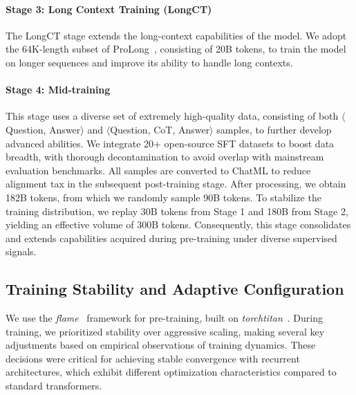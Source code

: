 \documentclass[]{bytedance_seed}
\newcommand{\1}{\mathbf{1}}
\begin{document}
\paragraph{Stage 3: Long Context Training (LongCT)}
The LongCT stage extends the long-context capabilities of the model. We adopt the 64K-length subset of ProLong~\cite{gao2024train}, consisting of 20B tokens, to train the model on longer sequences and improve its ability to handle long contexts.

\paragraph{Stage 4: Mid-training}
This stage uses a diverse set of extremely high-quality data, consisting of both $\langle$Question, Answer$\rangle$ and $\langle$Question, CoT, Answer$\rangle$ samples, to further develop advanced abilities. We integrate 20+ open-source SFT datasets to boost data breadth, with thorough decontamination to avoid overlap with mainstream evaluation benchmarks. All samples are converted to ChatML to reduce alignment tax in the subsequent post-training stage. After processing, we obtain 182B tokens, from which we randomly sample 90B tokens. To stabilize the training distribution, we replay 30B tokens from Stage 1 and 180B from Stage 2, yielding an effective volume of 300B tokens. Consequently, this stage consolidates and extends capabilities acquired during pre-training under diverse supervised signals.




\subsection{Training Stability and Adaptive Configuration}

We use the \textit{flame}~\cite{zhang2025flame} framework for pre-training, built on \textit{torchtitan}~\cite{liang2025torchtitan}. During training, we prioritized stability over aggressive scaling, making several key adjustments based on empirical observations of training dynamics. These decisions were critical for achieving stable convergence with recurrent architectures, which exhibit different optimization characteristics compared to standard transformers.
\end{document}
